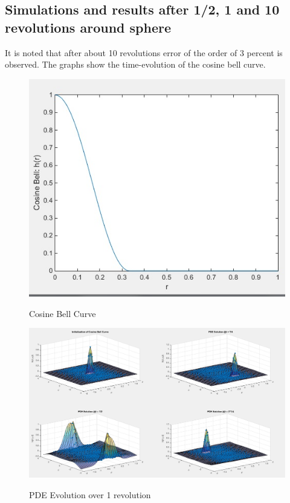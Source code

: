 \documentclass[11pt]{article}
\begin{document}
\subsection{Simulations and results after 1/2, 1 and 10 revolutions around sphere}
It is noted that after about 10 revolutions error of the order of $3$ percent is observed.  The graphs show the time-evolution of the cosine bell curve. 


\begin{figure}[h!]
\centering
\includegraphics[scale=0.7]{CosineBellGraph.jpg}\\
\caption{Cosine Bell Curve}
\label{fig:CosineBellCurve}
\end{figure}

\begin{figure}[h!]
\centering
\includegraphics[scale=0.4]{pdeEvolGlobalRBF.jpg}\\
\caption{PDE Evolution over 1 revolution}
\label{fig:PDEvolGlobalRBF}
\end{figure}
\end{document}
